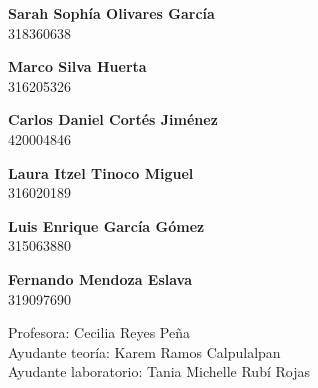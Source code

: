 \begin{titlepage}
\vspace{5mm}
    
\begin{minipage}{0.4\textwidth}
    \textbf{\large{Sarah Sophía Olivares García}}\\
            318360638
\end{minipage}
\begin{minipage}{0.4\textwidth}
    \begin{flushright}
        \textbf{\large{Marco Silva Huerta}}\\
            316205326        
    \end{flushright}
\end{minipage}
    
\vspace{5mm}
    
\begin{minipage}{0.4\textwidth}
        \textbf{\large{Carlos Daniel Cortés Jiménez}}\\    
            420004846        
\end{minipage}
\begin{minipage}{0.4\textwidth}
    \begin{flushright}
        \textbf{\large{Laura Itzel Tinoco Miguel}}\\
            316020189
    \end{flushright}
\end{minipage}

\vspace{5mm}

\begin{minipage}{0.4\textwidth}
        \textbf{\large{Luis Enrique García Gómez}}\\    
            315063880
\end{minipage}
\begin{minipage}{0.4\textwidth}
    \begin{flushright}
        \textbf{\large{Fernando Mendoza Eslava}}\\
            319097690
    \end{flushright}
\end{minipage}
    
\vspace{8mm}

\begin{minipage}{0.8\textwidth}
    \begin{flushleft} \large
        Profesora: Cecilia Reyes Peña\\
        Ayudante teoría: Karem Ramos Calpulalpan \\
        Ayudante laboratorio: Tania Michelle Rubí Rojas\\                    
    \end{flushleft}
\end{minipage}


\end{titlepage}
